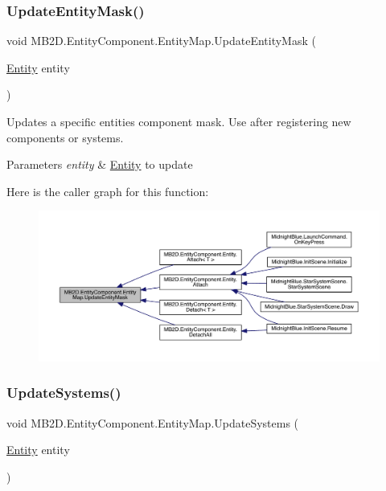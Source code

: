 \subsubsection{\texorpdfstring{Update\+Entity\+Mask()}{UpdateEntityMask()}}
{\footnotesize\ttfamily void M\+B2\+D.\+Entity\+Component.\+Entity\+Map.\+Update\+Entity\+Mask (\begin{DoxyParamCaption}\item[{\hyperlink{class_m_b2_d_1_1_entity_component_1_1_entity}{Entity}}]{entity }\end{DoxyParamCaption})\hspace{0.3cm}{\ttfamily [inline]}}



Updates a specific entities component mask. Use after registering new components or systems. 


\begin{DoxyParams}{Parameters}
{\em entity} & \hyperlink{class_m_b2_d_1_1_entity_component_1_1_entity}{Entity} to update\\
\hline
\end{DoxyParams}
Here is the caller graph for this function\+:
\nopagebreak
\begin{figure}[H]
\begin{center}
\leavevmode
\includegraphics[width=350pt]{class_m_b2_d_1_1_entity_component_1_1_entity_map_a968ce46cbba14cdc7814dd308f133949_icgraph}
\end{center}
\end{figure}
\hypertarget{class_m_b2_d_1_1_entity_component_1_1_entity_map_ab6078e0b6eddb220b9bbf5d358d6e365}{}\label{class_m_b2_d_1_1_entity_component_1_1_entity_map_ab6078e0b6eddb220b9bbf5d358d6e365} 
\subsubsection{\texorpdfstring{Update\+Systems()}{UpdateSystems()}}
{\footnotesize\ttfamily void M\+B2\+D.\+Entity\+Component.\+Entity\+Map.\+Update\+Systems (\begin{DoxyParamCaption}\item[{\hyperlink{class_m_b2_d_1_1_entity_component_1_1_entity}{Entity}}]{entity }\end{DoxyParamCaption})\hspace{0.3cm}{\ttfamily [inline]}}



